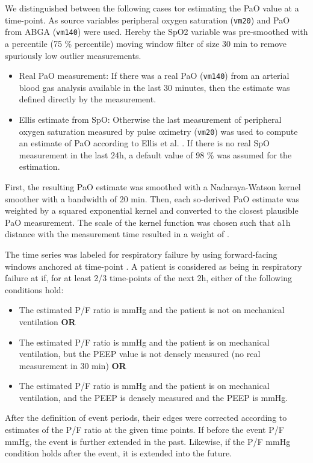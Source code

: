 \documentclass{article}
\begin{document}
We distinguished between the following cases tor estimating the PaO value at a time-point. As source variables peripheral oxygen saturation (\texttt{vm20}) and PaO from ABGA (\texttt{vm140}) were used. Hereby the SpO2 variable was pre-smoothed with a percentile (75 \% percentile) moving window filter of size 30 min to remove spuriously low outlier measurements.

\begin{itemize}
    \item Real PaO measurement: If there was a real PaO (\texttt{vm140}) from an arterial blood gas analysis available in the last 30 minutes, then the estimate was defined directly by the measurement.
    \item Ellis estimate from SpO: Otherwise the last measurement of peripheral oxygen saturation measured by pulse oximetry (\texttt{vm20}) was used to compute an estimate of PaO according to Ellis et al. \cite{ellis1989determination}. If there is no real SpO measurement in the last 24h, a default value of 98 \% was assumed for the estimation.
\end{itemize}

First, the resulting PaO estimate was smoothed with a Nadaraya-Watson kernel smoother with a bandwidth of 20 min. Then, each so-derived PaO estimate was weighted by a squared exponential kernel and converted to the closest plausible PaO measurement. The scale of the kernel function was chosen such that  a1h distance with the measurement time resulted in a weight of .

The time series was labeled for respiratory failure by using forward-facing windows anchored at time-point . A patient is considered as being in respiratory failure at  if, for at least 2/3 time-points of the next 2h, either of the following conditions hold:

\begin{itemize}
    \item The estimated P/F ratio is  mmHg and the patient is not on mechanical ventilation \textbf{OR} \item The estimated P/F ratio is  mmHg and the patient is on mechanical ventilation, but the PEEP value is not densely measured (no real measurement in 30 min) \textbf{OR} 
\item The estimated P/F ratio is  mmHg and the patient is on mechanical ventilation, and the PEEP is densely measured and the PEEP is  mmHg.
\end{itemize}

After the definition of event periods, their edges were corrected according to estimates of the P/F ratio at the given time points. If before the event P/F mmHg, the event is further extended in the past.  Likewise, if the P/F mmHg condition holds after the event, it is extended into the future.
\end{document}
